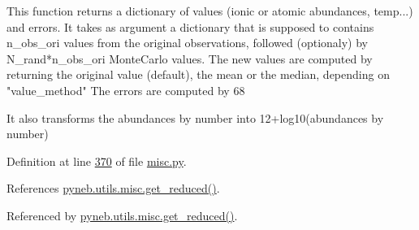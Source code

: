 \begin{DoxyVerb}This function returns a dictionary of values (ionic or atomic abundances, temp...) and errors.
It takes as argument a dictionary that is supposed to contains n_obs_ori values from
    the original observations, followed (optionaly) by N_rand*n_obs_ori MonteCarlo values.
The new values are computed by returning the original value (default), the mean or the median, 
    depending on "value_method"
The errors are computed by 68%

It also transforms the abundances by number into 12+log10(abundances by number)
\end{DoxyVerb}
 

Definition at line \hyperlink{misc_8py_source_l00370}{370} of file \hyperlink{misc_8py_source}{misc.\-py}.



References \hyperlink{misc_8py_source_l00320}{pyneb.\-utils.\-misc.\-get\-\_\-reduced()}.



Referenced by \hyperlink{misc_8py_source_l00320}{pyneb.\-utils.\-misc.\-get\-\_\-reduced()}.


